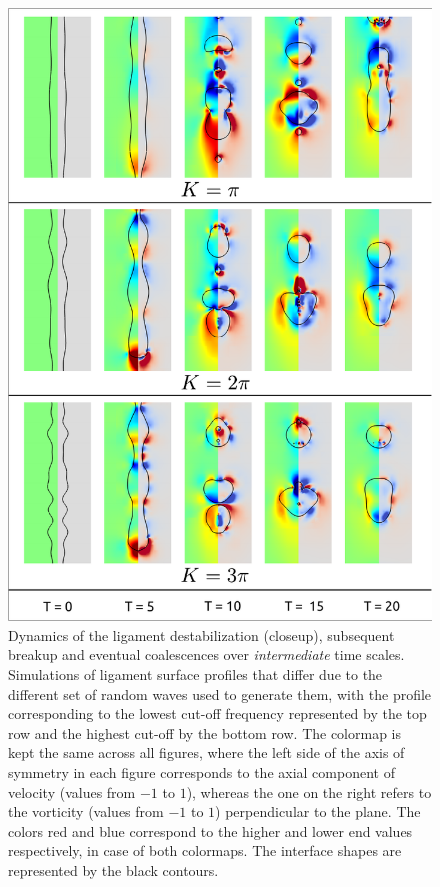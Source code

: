 \begin{figure}
\centering
\includegraphics{plots/ligament_breakup/wave_compare.pdf}
	\caption{Dynamics of the ligament destabilization (closeup), subsequent breakup 
	and eventual coalescences over \textit{intermediate} time scales.
	Simulations of ligament surface profiles that differ due to the 
	different set of random waves used to generate them, with the 
	profile corresponding to the lowest cut-off frequency represented 
	by the top row and the highest cut-off by the bottom row. 
	The colormap is kept the same across all figures, where the left 
	side of the axis of symmetry in each figure corresponds to the axial component of 
	velocity (values from $-1$ to $1$), whereas the one on the right refers to 
	the vorticity (values from $-1$ to $1$) perpendicular to the plane. 
	The colors red and blue correspond to the higher and lower 
	end values respectively, in case of both colormaps. 
	The interface shapes are represented by the black contours.
	}
\label{wave_comp}
\end{figure}


